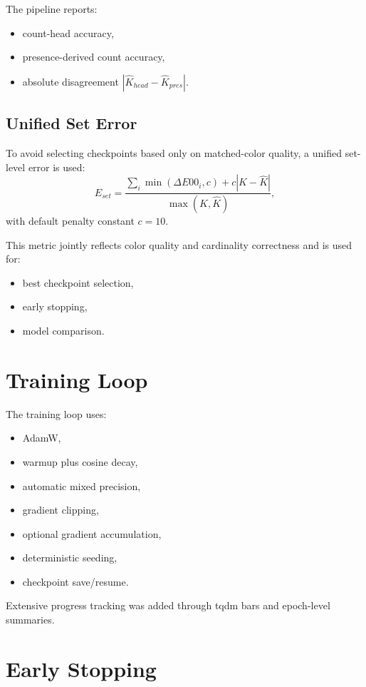 \documentclass[11pt,a4paper]{article}
\begin{document}
The pipeline reports:
\begin{itemize}[leftmargin=2em]
    \item count-head accuracy,
    \item presence-derived count accuracy,
    \item absolute disagreement $|\hat{K}_{head} - \hat{K}_{pres}|$.
\end{itemize}

\subsection{Unified Set Error}

To avoid selecting checkpoints based only on matched-color quality, a unified set-level error is used:
\begin{equation}
E_{set}
=
\frac{
\sum_i \min(\Delta E00_i, c)
+
c |K - \hat{K}|
}{
\max(K,\hat{K})
},
\end{equation}
with default penalty constant $c=10$.

This metric jointly reflects color quality and cardinality correctness and is used for:
\begin{itemize}[leftmargin=2em]
    \item best checkpoint selection,
    \item early stopping,
    \item model comparison.
\end{itemize}

\section{Training Loop}

The training loop uses:
\begin{itemize}[leftmargin=2em]
    \item AdamW,
    \item warmup plus cosine decay,
    \item automatic mixed precision,
    \item gradient clipping,
    \item optional gradient accumulation,
    \item deterministic seeding,
    \item checkpoint save/resume.
\end{itemize}

Extensive progress tracking was added through tqdm bars and epoch-level summaries.

\section{Early Stopping}
\end{document}
